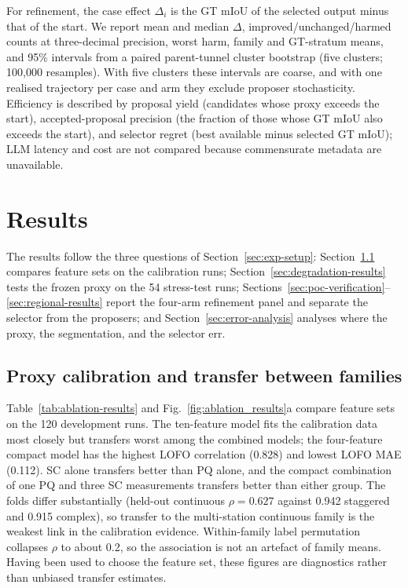 \documentclass[a4paper,fleqn]{cas-dc}
\begin{document}
For refinement, the case effect $\Delta_i$ is the GT mIoU of the selected output minus that of the start. We report mean and median $\Delta$, improved/unchanged/harmed counts at three-decimal precision, worst harm, family and GT-stratum means, and 95\% intervals from a paired parent-tunnel cluster bootstrap (five clusters; 100{,}000 resamples). With five clusters these intervals are coarse, and with one realised trajectory per case and arm they exclude proposer stochasticity. Efficiency is described by proposal yield (candidates whose proxy exceeds the start), accepted-proposal precision (the fraction of those whose GT mIoU also exceeds the start), and selector regret (best available minus selected GT mIoU); LLM latency and cost are not compared because commensurate metadata are unavailable.

\section{Results}\label{sec:results}

The results follow the three questions of Section~\ref{sec:exp-setup}: Section~\ref{sec:main-results} compares feature sets on the calibration runs; Section~\ref{sec:degradation-results} tests the frozen proxy on the 54 stress-test runs; Sections~\ref{sec:poc-verification}--\ref{sec:regional-results} report the four-arm refinement panel and separate the selector from the proposers; and Section~\ref{sec:error-analysis} analyses where the proxy, the segmentation, and the selector err.

\subsection{Proxy calibration and transfer between families}\label{sec:main-results}

Table~\ref{tab:ablation-results} and Fig.~\ref{fig:ablation_results}a compare feature sets on the 120 development runs. The ten-feature model fits the calibration data most closely but transfers worst among the combined models; the four-feature compact model has the highest LOFO correlation (0.828) and lowest LOFO MAE (0.112). SC alone transfers better than PQ alone, and the compact combination of one PQ and three SC measurements transfers better than either group. The folds differ substantially (held-out continuous $\rho=0.627$ against 0.942 staggered and 0.915 complex), so transfer to the multi-station continuous family is the weakest link in the calibration evidence. Within-family label permutation collapses $\rho$ to about 0.2, so the association is not an artefact of family means. Having been used to choose the feature set, these figures are diagnostics rather than unbiased transfer estimates.
\end{document}
